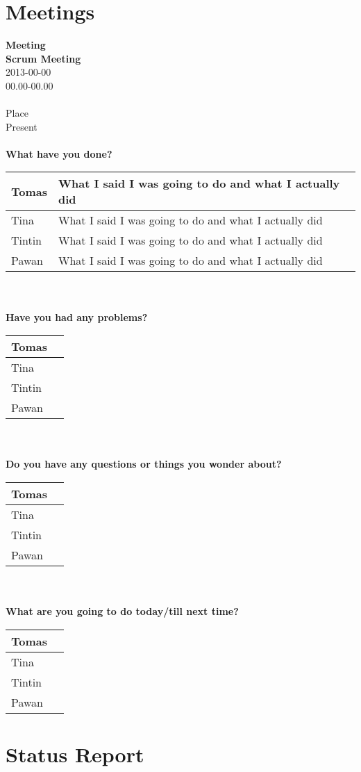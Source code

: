 \documentclass{report}
\begin{document}
\section{Meetings}
\textbf{Meeting}\\
\textbf{Scrum Meeting}\\
2013-00-00\\
00.00-00.00\\\\
Place\\
Present\\\\
\textbf{What have you done?}\\
\begin{tabular}{| l | p{9 cm} |} \hline
Tomas & What I said I was going to do and what I actually did \\ \hline
Tina & What I said I was going to do and what I actually did  \\ \hline
Tintin & What I said I was going to do and what I actually did  \\ \hline
Pawan & What I said I was going to do and what I actually did  \\ \hline
\end{tabular}\\\\
\textbf{Have you had any problems?}\\
\begin{tabular}{| l | p{9 cm} |} \hline
Tomas & \\ \hline
Tina &  \\ \hline
Tintin &  \\ \hline
Pawan &  \\ \hline
\end{tabular}\\\\
\textbf{Do you have any questions or things you wonder about?}\\
\begin{tabular}{| l | p{9 cm} |} \hline
Tomas & \\ \hline
Tina &  \\ \hline
Tintin &  \\ \hline
Pawan &  \\ \hline
\end{tabular}\\\\
\textbf{What are you going to do today/till next time?}\\
\begin{tabular}{| l | p{9 cm} |} \hline
Tomas & \\ \hline
Tina &  \\ \hline
Tintin &  \\ \hline
Pawan &  \\ \hline
\end{tabular}

\section{Status Report}
\end{document}
